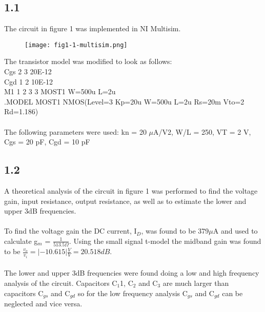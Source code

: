\subsection*{1.1}
  The circuit in figure 1 was implemented in NI Multisim.\\

    \begin{figure}[h!]
        \centering
        \texttt{[image: fig1-1-multisim.png]}
    \end{figure} 

  The  transistor  model was modified to look as follows:\\
  Cgs  2 3 20E-12\\ 
  Cgd 1 2 10E-12\\
  M1 1 2 3 3 MOST1 W=500u L=2u\\
  .MODEL MOST1 NMOS(Level=3 Kp=20u W=500u L=2u Rs=20m Vto=2 Rd=1.186)\\\\

  The following parameters were used: kn =  20  $\mu$A/V2,  W/L =  250,  VT =  2  V,  Cgs =  20  pF, Cgd = 10 pF\\
\pagebreak
\subsection*{1.2}

  A theoretical analysis of the circuit in figure 1 was performed to find the voltage gain, input resistance, output resistance, as well as to estimate the lower and upper 3dB frequencies.\\\\

  To find the voltage gain the DC current, I$_D$, was found to be 379$\mu$A and used to calculate g$_m$ = $\frac{1}{513.5 \Omega}$. Using the small signal t-model the midband gain was found to be $\frac{v_o}{v_i} = |-10.615| \frac{V}{V} = 20.518 dB$.\\\\

  The lower and upper 3dB frequencies were found doing a low and high frequency analysis of the circuit. Capacitors C$_1$1, C$_2$ and C$_3$ are much larger than capacitors C$_{gs}$ and C$_{gd}$ so for the low frequency analysis C$_{gs}$ and C$_{gd}$ can be neglected and vice versa.\\

